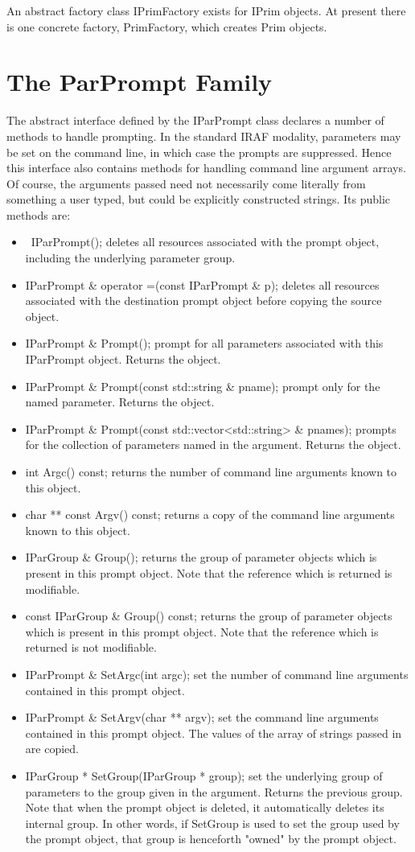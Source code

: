 An abstract factory class IPrimFactory exists for IPrim
objects. At present there is one concrete factory, PrimFactory,
which creates Prim objects.

\section{The ParPrompt Family}
The abstract interface defined by the IParPrompt class
declares a number of methods to handle prompting. In
the standard IRAF modality, parameters may be set on
the command line, in which case the prompts are suppressed.
Hence this interface also contains methods for handling
command line argument arrays. Of course, the arguments
passed need not necessarily come literally from something
a user typed, but could be explicitly constructed strings.
Its public methods are:

\begin{itemize}
\item ~IParPrompt(); deletes all resources associated
with the prompt object, including the underlying parameter
group.
\item IParPrompt \& operator =(const IParPrompt \& p); deletes
all resources associated with the destination prompt object
before copying the source object.
\item IParPrompt \& Prompt(); prompt for all parameters
associated with this IParPrompt object. Returns the object.
\item IParPrompt \& Prompt(const std::string \& pname); prompt
only for the named parameter. Returns the object.
\item IParPrompt \& Prompt(const std::vector<std::string> \& pnames);
prompts for the collection of parameters named in the argument.
Returns the object.
\item int Argc() const; returns the number of command line
arguments known to this object.
\item char ** const Argv() const; returns a copy of the command
line arguments known to this object.
\item IParGroup \& Group(); returns the group of parameter
objects which is present in this prompt object. Note that
the reference which is returned is modifiable.
\item const IParGroup \& Group() const; returns the group of
parameter objects which is present in this prompt object. Note
that the reference which is returned is not modifiable.
\item IParPrompt \& SetArgc(int argc); set the number of
command line arguments contained in this prompt object.
\item IParPrompt \& SetArgv(char ** argv); set the command
line arguments contained in this prompt object. The values
of the array of strings passed in are copied.
\item IParGroup * SetGroup(IParGroup * group); set the
underlying group of parameters to the group given in
the argument. Returns the previous group. Note that when
the prompt object is deleted, it automatically deletes
its internal group. In other words, if SetGroup is used
to set the group used by the prompt object, that group is
henceforth "owned" by the prompt object.
\end{itemize}

